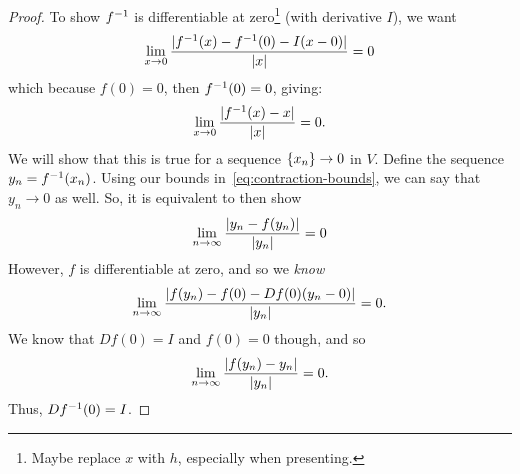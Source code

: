 \documentclass{article}
\begin{document}
\begin{proof}
  To show $f^{-1}$ is differentiable at zero\footnote{Maybe replace $x$ with $h$, especially when presenting.} (with derivative $I$), we want
  \[ \lim_{x \to 0} \frac{\lvert f^{-1}(x) - f^{-1}(0) - I(x - 0)\rvert}{\lvert x\rvert} = 0 \]
  which because $f(0) = 0$, then $f^{-1}(0) = 0$, giving:
  \[ \lim_{x \to 0} \frac{\lvert f^{-1}(x) - x\rvert}{\lvert x\rvert} = 0. \]
  We will show that this is true for a sequence $\lbrace x_{n}\rbrace \to 0$ in $V$. Define the sequence $y_{n} = f^{-1}(x_{n})$.
  Using our bounds in~\eqref{eq:contraction-bounds}, we can say that $y_{n} \to 0$ as well. So, it is equivalent to then show
  \[ \lim_{n \to \infty}\frac{\lvert y_{n} - f(y_{n})\rvert}{\lvert y_{n}\rvert} = 0 \]
  However, $f$ is differentiable at zero, and so we \emph{know}
  \[ \lim_{n \to \infty}\frac{\lvert f(y_{n}) - f(0) - Df(0)(y_{n} - 0)\rvert}{\lvert y_{n}\rvert} = 0. \]
  We know that $Df(0) = I$ and $f(0) = 0$ though, and so
  \[ \lim_{n \to \infty}\frac{\lvert f(y_{n}) - y_{n}\rvert}{\lvert y_{n}\rvert} = 0. \]
  Thus, $Df^{-1}(0) = I$.
\end{proof}
\end{document}
